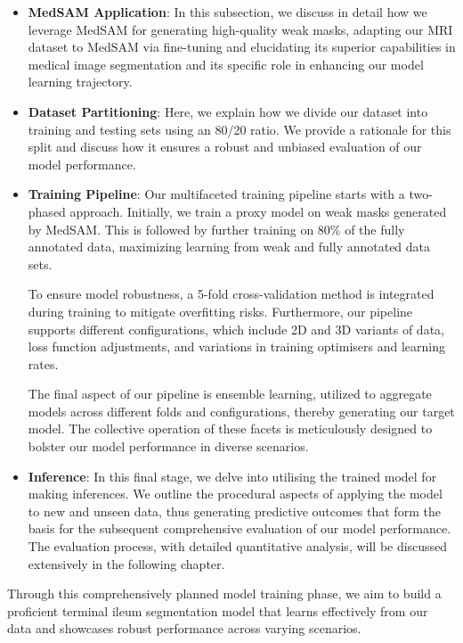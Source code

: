 \begin{itemize}
\item \textbf{MedSAM Application}:
In this subsection, we discuss in detail how we leverage MedSAM for generating high-quality weak masks, adapting our MRI dataset to MedSAM via fine-tuning and elucidating its superior capabilities in medical image segmentation and its specific role in enhancing our model learning trajectory.

\item \textbf{Dataset Partitioning}:
Here, we explain how we divide our dataset into training and testing sets using an 80/20 ratio. We provide a rationale for this split and discuss how it ensures a robust and unbiased evaluation of our model performance.

\item \textbf{Training Pipeline}:
Our multifaceted training pipeline starts with a two-phased approach. Initially, we train a proxy model on weak masks generated by MedSAM. This is followed by further training on 80\%  of the fully annotated data, maximizing learning from weak and fully annotated data sets.

To ensure model robustness, a 5-fold cross-validation method is integrated during training to mitigate overfitting risks. Furthermore, our pipeline supports different configurations, which include 2D and 3D variants of data, loss function adjustments, and variations in training optimisers and learning rates.

The final aspect of our pipeline is ensemble learning, utilized to aggregate models across different folds and configurations, thereby generating our target model. The collective operation of these facets is meticulously designed to bolster our model performance in diverse scenarios.

\item \textbf{Inference}:
In this final stage, we delve into utilising the trained model for making inferences. We outline the procedural aspects of applying the model to new and unseen data, thus generating predictive outcomes that form the basis for the subsequent comprehensive evaluation of our model performance. The evaluation process, with detailed quantitative analysis, will be discussed extensively in the following chapter.
\end{itemize}

Through this comprehensively planned model training phase, we aim to build a proficient terminal ileum segmentation model that learns effectively from our data and showcases robust performance across varying scenarios.

